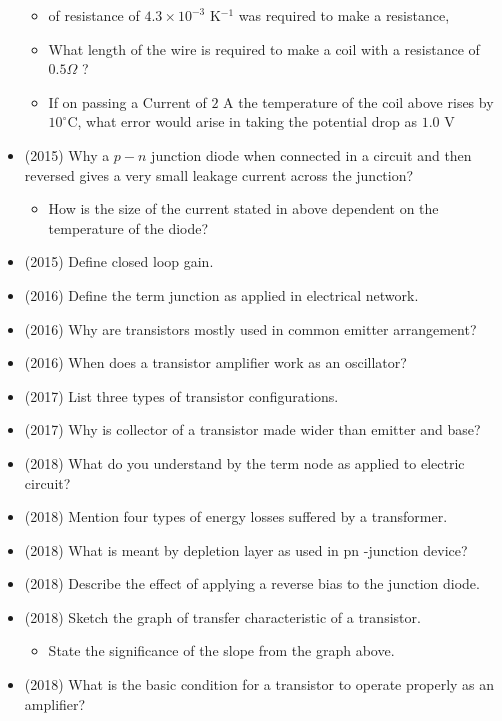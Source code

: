 \documentclass{article}
\begin{document}
\begin{itemize}
 \begin{itemize}
\item of resistance of $ 4.3\times10^{-3}$ K$ ^{-1}$ was required to make a resistance,
\item  What length of the wire is required to make a coil with a resistance of $ 0.5\Omega $ ?
\item If on passing a Current of $ 2$ A the temperature of the coil above rises  by $ 10^{\circ}$C, what error would arise in taking the potential drop as $ 1.0$ V 
\end{itemize}
\item (2015)  Why a $ p-n$ junction diode when connected in a circuit and then reversed gives a very small leakage current across the junction? 
 \begin{itemize}
\item How is the size of the current stated in above dependent on the temperature of the diode?
\end{itemize}
\item (2015)  Define closed loop gain. 
\item (2016)  Define the term junction as applied in electrical network.
\item (2016)  Why are transistors mostly used in common emitter arrangement?
\item (2016)  When does a transistor amplifier work as an oscillator?
\item (2017)  List three types of transistor configurations.
\item (2017)  Why is collector of a transistor made wider than emitter and base? 
\item (2018)  What do you understand by the term node as applied to electric circuit?
\item (2018)  Mention four types of energy losses suffered by a transformer.  
\item (2018)  What is meant by depletion layer as used in pn -junction device? 
\item (2018)  Describe the effect of applying a reverse bias to the junction diode. 
\item (2018)  Sketch the graph of transfer characteristic of a transistor. 
 \begin{itemize}
\item State the significance of the slope from the graph above.
\end{itemize}
\item (2018)  What is the basic condition for a transistor to operate properly as an amplifier? 

\end{itemize}
\end{document}
